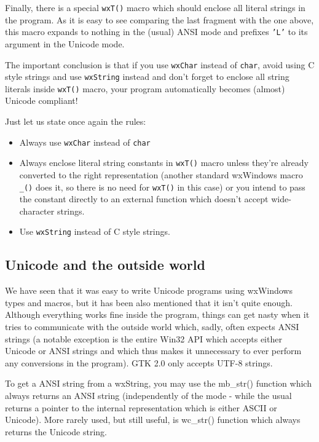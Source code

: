 Finally, there is a special {\tt wxT()} macro which should enclose all literal
strings in the program. As it is easy to see comparing the last fragment with
the one above, this macro expands to nothing in the (usual) ANSI mode and
prefixes {\tt 'L'} to its argument in the Unicode mode.

The important conclusion is that if you use {\tt wxChar} instead of 
{\tt char}, avoid using C style strings and use {\tt wxString} instead and
don't forget to enclose all string literals inside {\tt wxT()} macro, your
program automatically becomes (almost) Unicode compliant!

Just let us state once again the rules:

\begin{itemize}
\item Always use {\tt wxChar} instead of {\tt char}
\item Always enclose literal string constants in {\tt wxT()} macro unless
they're already converted to the right representation (another standard
wxWindows macro {\tt \_()} does it, so there is no need for {\tt wxT()} in this
case) or you intend to pass the constant directly to an external function
which doesn't accept wide-character strings.
\item Use {\tt wxString} instead of C style strings.
\end{itemize}

\subsection{Unicode and the outside world}

We have seen that it was easy to write Unicode programs using wxWindows types
and macros, but it has been also mentioned that it isn't quite enough.
Although everything works fine inside the program, things can get nasty when
it tries to communicate with the outside world which, sadly, often expects
ANSI strings (a notable exception is the entire Win32 API which accepts either
Unicode or ANSI strings and which thus makes it unnecessary to ever perform
any conversions in the program). GTK 2.0 only accepts UTF-8 strings.

To get a ANSI string from a wxString, you may use the 
mb\_str() function which always returns an ANSI
string (independently of the mode - while the usual 
 returns a pointer to the internal
representation which is either ASCII or Unicode). More rarely used, but still
useful, is wc\_str() function which always returns
the Unicode string.


